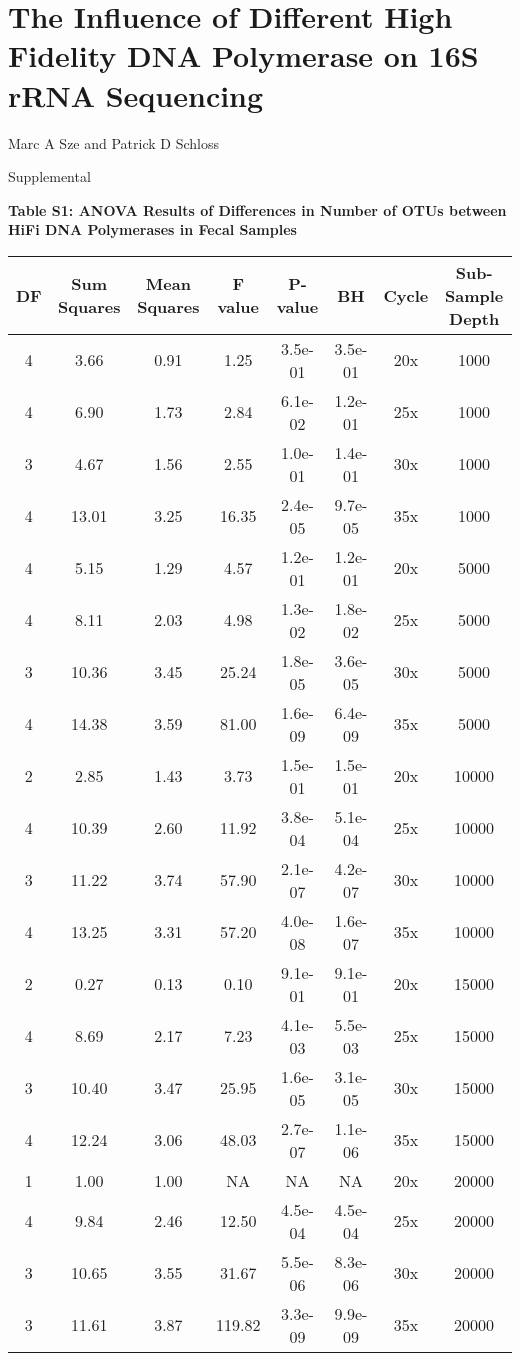 \documentclass[12pt,]{article}
\title{}
\author{}
\date{}
\begin{document}
\section{The Influence of Different High Fidelity DNA Polymerase on 16S
rRNA
Sequencing}\label{the-influence-of-different-high-fidelity-dna-polymerase-on-16s-rrna-sequencing}

\vspace{10mm}

\begin{center}
Marc A Sze and Patrick D Schloss

\vspace{10mm}

Supplemental
\end{center}

\newpage

\textbf{Table S1: ANOVA Results of Differences in Number of OTUs between
HiFi DNA Polymerases in Fecal Samples}

\begin{longtable}[]{@{}cccccccc@{}}
\toprule
DF & Sum Squares & Mean Squares & F value & P-value & BH & Cycle &
Sub-Sample Depth\tabularnewline
\midrule
\endhead
4 & 3.66 & 0.91 & 1.25 & 3.5e-01 & 3.5e-01 & 20x & 1000\tabularnewline
4 & 6.90 & 1.73 & 2.84 & 6.1e-02 & 1.2e-01 & 25x & 1000\tabularnewline
3 & 4.67 & 1.56 & 2.55 & 1.0e-01 & 1.4e-01 & 30x & 1000\tabularnewline
4 & 13.01 & 3.25 & 16.35 & 2.4e-05 & 9.7e-05 & 35x & 1000\tabularnewline
4 & 5.15 & 1.29 & 4.57 & 1.2e-01 & 1.2e-01 & 20x & 5000\tabularnewline
4 & 8.11 & 2.03 & 4.98 & 1.3e-02 & 1.8e-02 & 25x & 5000\tabularnewline
3 & 10.36 & 3.45 & 25.24 & 1.8e-05 & 3.6e-05 & 30x & 5000\tabularnewline
4 & 14.38 & 3.59 & 81.00 & 1.6e-09 & 6.4e-09 & 35x & 5000\tabularnewline
2 & 2.85 & 1.43 & 3.73 & 1.5e-01 & 1.5e-01 & 20x & 10000\tabularnewline
4 & 10.39 & 2.60 & 11.92 & 3.8e-04 & 5.1e-04 & 25x &
10000\tabularnewline
3 & 11.22 & 3.74 & 57.90 & 2.1e-07 & 4.2e-07 & 30x &
10000\tabularnewline
4 & 13.25 & 3.31 & 57.20 & 4.0e-08 & 1.6e-07 & 35x &
10000\tabularnewline
2 & 0.27 & 0.13 & 0.10 & 9.1e-01 & 9.1e-01 & 20x & 15000\tabularnewline
4 & 8.69 & 2.17 & 7.23 & 4.1e-03 & 5.5e-03 & 25x & 15000\tabularnewline
3 & 10.40 & 3.47 & 25.95 & 1.6e-05 & 3.1e-05 & 30x &
15000\tabularnewline
4 & 12.24 & 3.06 & 48.03 & 2.7e-07 & 1.1e-06 & 35x &
15000\tabularnewline
1 & 1.00 & 1.00 & NA & NA & NA & 20x & 20000\tabularnewline
4 & 9.84 & 2.46 & 12.50 & 4.5e-04 & 4.5e-04 & 25x & 20000\tabularnewline
3 & 10.65 & 3.55 & 31.67 & 5.5e-06 & 8.3e-06 & 30x &
20000\tabularnewline
3 & 11.61 & 3.87 & 119.82 & 3.3e-09 & 9.9e-09 & 35x &
20000\tabularnewline
\bottomrule
\end{longtable}
\end{document}

